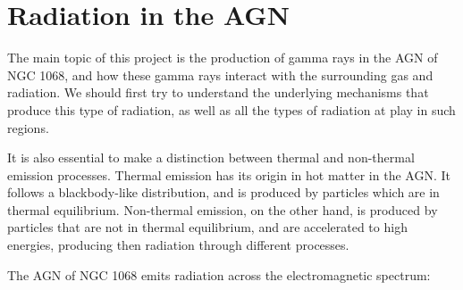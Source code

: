 \section{Radiation in the AGN}

The main topic of this project is the production of gamma rays in the AGN of NGC 1068, and how these gamma rays interact with the surrounding gas and radiation. We should first try to understand the underlying mechanisms that produce this type of radiation, as well as all the types of radiation at play in such regions.

It is also essential to make a distinction between thermal and non-thermal emission processes. Thermal emission has its origin in hot matter in the AGN. It follows a blackbody-like distribution, and is produced by particles which are in thermal equilibrium. Non-thermal emission, on the other hand, is produced by particles that are not in thermal equilibrium, and are accelerated to high energies, producing then radiation through different processes.

The AGN of NGC 1068 emits radiation across the electromagnetic spectrum:

